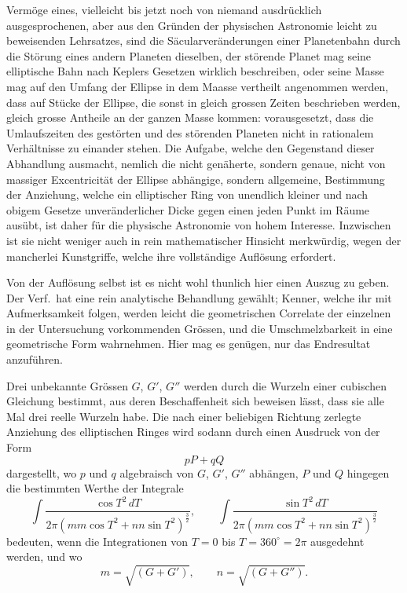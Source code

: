 \documentclass[12pt,a4paper]{article}
\begin{document}
Verm\"oge eines, vielleicht bis jetzt noch von niemand ausdr\"ucklich ausgesprochenen, aber aus den Gr\"unden der physischen Astronomie leicht zu beweisenden Lehrsatzes, sind die S\"acularver\"anderungen einer Planetenbahn durch die St\"orung eines andern Planeten dieselben, der st\"orende Planet mag seine elliptische Bahn nach Keplers Gesetzen wirklich beschreiben, oder seine Masse mag auf den Umfang der Ellipse in dem Maasse vertheilt angenommen werden, dass auf St\"ucke der Ellipse, die sonst in gleich grossen Zeiten beschrieben werden, gleich grosse Antheile an der ganzen Masse kommen: vorausgesetzt, dass die Umlaufszeiten des gest\"orten und des st\"orenden Planeten nicht in rationalem Verh\"altnisse zu einander stehen. Die Aufgabe, welche den Gegenstand dieser Abhandlung ausmacht, nemlich die nicht gen\"aherte, sondern genaue, nicht von massiger Excentricit\"at der Ellipse abh\"angige, sondern allgemeine, Bestimmung der Anziehung, welche ein elliptischer Ring von unendlich kleiner und nach obigem Gesetze unver\"anderlicher Dicke gegen einen jeden Punkt im R\"aume aus\"ubt, ist daher f\"ur die physische Astronomie von hohem Interesse. Inzwischen ist sie nicht weniger auch in rein mathematischer Hinsicht merkw\"urdig, wegen der mancherlei Kunstgriffe, welche ihre vollst\"andige Aufl\"osung erfordert.

Von der Aufl\"osung selbst ist es nicht wohl thunlich hier einen Auszug zu geben. Der Verf.\ hat eine rein analytische Behandlung gew\"ahlt; Kenner, welche ihr mit Aufmerksamkeit folgen, werden leicht die geometrischen Correlate der einzelnen in der Untersuchung vorkommenden Gr\"ossen, und die Umschmelzbarkeit in eine geometrische Form wahrnehmen. Hier mag es gen\"ugen, nur das Endresultat anzuf\"uhren.

Drei unbekannte Gr\"ossen $G$, $G'$, $G''$ werden durch die Wurzeln einer cubischen Gleichung bestimmt, aus deren Beschaffenheit sich beweisen l\"asst, dass sie alle Mal drei reelle Wurzeln habe. Die nach einer beliebigen Richtung zerlegte Anziehung des elliptischen Ringes wird sodann durch einen Ausdruck von der Form
\[
pP + qQ
\]
dargestellt, wo $p$ und $q$ algebraisch von $G$, $G'$, $G''$ abh\"angen, $P$ und $Q$ hingegen die bestimmten Werthe der Integrale
\[
\int\frac{\cos T^2\,dT}{2\pi(mm\cos T^2 + nn\sin T^2)^{\frac{3}{2}}}, \qquad
\int\frac{\sin T^2\,dT}{2\pi(mm\cos T^2 + nn\sin T^2)^{\frac{3}{2}}}
\]
bedeuten, wenn die Integrationen von $T=0$ bis $T=360^{\circ}=2\pi$ ausgedehnt werden, und wo
\[
m = \sqrt{(G+G')}, \qquad n = \sqrt{(G+G'')}.
\]
\end{document}
